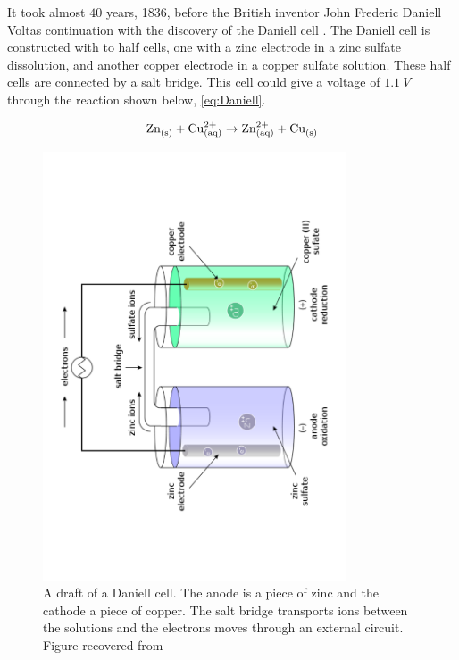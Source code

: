 It took almost $40$ years, 1836, before the British inventor John Frederic Daniell Voltas continuation with the discovery of the Daniell cell \cite{daniell1836xi}. The Daniell cell is constructed with to half cells, one with a zinc electrode in a zinc sulfate dissolution, and another copper electrode in a copper sulfate solution. These half cells are connected by a salt bridge. This cell could give a voltage of $\SI{1.1}{V}$ through the reaction shown below, \ref{eq:Daniell}. 


\begin{align}\label{eq:Daniell}
\ce{Zn_{(s)}} + \ce{Cu^{2+}_{(aq)}} \rightarrow \ce{Zn^2+_{(aq)}} + \ce{Cu_{(s)}} 
\end{align}

\begin{figure}[H]
    \centering
    \includegraphics[angle=270,width=0.8\textwidth]{600px-Galvanic_cell_labeled.pdf}
    \caption{A draft of a Daniell cell. The anode is a piece of zinc and the cathode a piece of copper. The salt bridge transports ions between the solutions and the electrons moves through an external circuit. Figure recovered from \cite{wiki:Daniellcell} }
    \label{fig:DaniellCell}
\end{figure}


